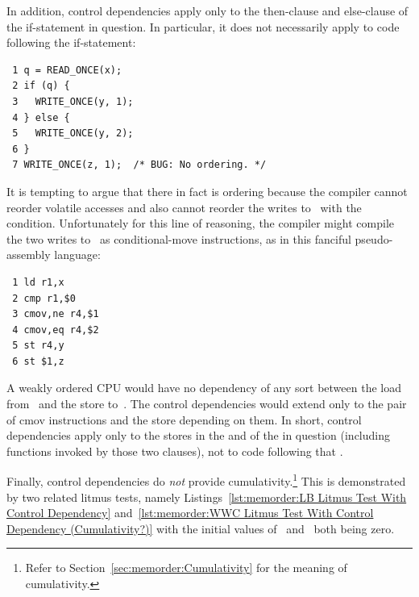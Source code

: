In addition, control dependencies apply only to the then-clause and
else-clause of the if-statement in question.
In particular, it does
not necessarily apply to code following the if-statement:

\vspace{5pt}
\begin{minipage}[t]{\columnwidth}
\scriptsize
\begin{verbatim}
 1 q = READ_ONCE(x);
 2 if (q) {
 3   WRITE_ONCE(y, 1);
 4 } else {
 5   WRITE_ONCE(y, 2);
 6 }
 7 WRITE_ONCE(z, 1);  /* BUG: No ordering. */
\end{verbatim}
\end{minipage}
\vspace{5pt}

It is tempting to argue that there in fact is ordering because the
compiler cannot reorder volatile accesses and also cannot reorder
the writes to~ with the condition.
Unfortunately for this line
of reasoning, the compiler might compile the two writes to~ as
conditional-move instructions, as in this fanciful pseudo-assembly
language:

\vspace{5pt}
\begin{minipage}[t]{\columnwidth}
\scriptsize
\begin{verbatim}
 1 ld r1,x
 2 cmp r1,$0
 3 cmov,ne r4,$1
 4 cmov,eq r4,$2
 5 st r4,y
 6 st $1,z
\end{verbatim}
\end{minipage}
\vspace{5pt}

A weakly ordered CPU would have no dependency of any sort between the load
from~ and the store to~.
The control dependencies would extend
only to the pair of cmov instructions and the store depending on them.
In short, control dependencies apply only to the stores in the 
and  of the  in question (including functions
invoked by those two clauses), not to code following that .

Finally, control dependencies do \emph{not} provide cumulativity.\footnote{
	Refer to Section~\ref{sec:memorder:Cumulativity} for
	the meaning of cumulativity.}
This is demonstrated by two related litmus tests, namely
Listings~\ref{lst:memorder:LB Litmus Test With Control Dependency}
and~\ref{lst:memorder:WWC Litmus Test With Control Dependency (Cumulativity?)}
with the initial values
of~ and~ both being zero.

